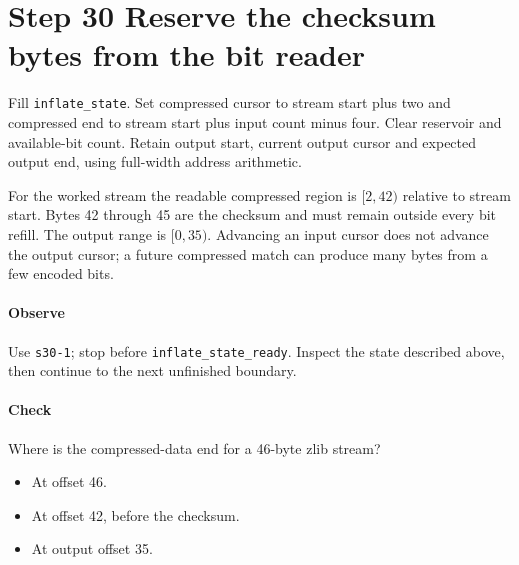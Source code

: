 \section{Step 30 Reserve the checksum bytes from the bit reader}\label{png-inflate-s30}
Fill \texttt{inflate\_state}. Set compressed cursor to stream start plus two and compressed end to stream start plus input count minus four. Clear reservoir and available-bit count. Retain output start, current output cursor and expected output end, using full-width address arithmetic.

For the worked stream the readable compressed region is $[2,42)$ relative to stream start. Bytes 42 through 45 are the checksum and must remain outside every bit refill. The output range is $[0,35)$. Advancing an input cursor does not advance the output cursor; a future compressed match can produce many bytes from a few encoded bits.

\paragraph{Observe} Use \texttt{s30-1}; stop before \texttt{inflate\_state\_ready}. Inspect the state described above, then continue to the next unfinished boundary.

\paragraph{Check} Where is the compressed-data end for a 46-byte zlib stream?
\begin{itemize}
  \item[A.] At offset 46.
  \item[B.] At offset 42, before the checksum.
  \item[C.] At output offset 35.
\end{itemize}
